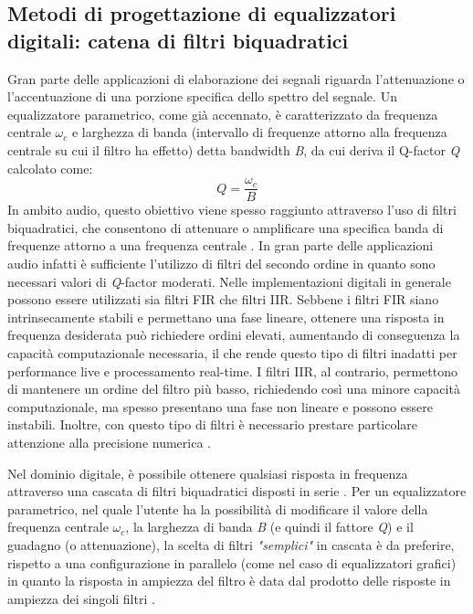 \documentclass[12pt]{report}
\begin{document}
\subsection{Metodi di progettazione di equalizzatori digitali: catena di filtri biquadratici}
Gran parte delle applicazioni di elaborazione dei segnali riguarda l'attenuazione o l'accentuazione di una porzione specifica dello spettro del segnale.
Un equalizzatore parametrico, come già accennato, è caratterizzato da frequenza centrale \(\omega_c\) e larghezza di banda (intervallo di frequenze attorno alla frequenza centrale su cui il filtro ha effetto) detta bandwidth \textit{B}, da cui deriva il Q-factor \textit{Q} calcolato come:
\begin{equation}
    \textit{Q}=\frac{\omega_c}{\textit{B}}
    \label{eq:q-factor}
\end{equation}
In ambito audio, questo obiettivo viene spesso raggiunto attraverso l’uso di filtri biquadratici, che consentono di attenuare o amplificare una specifica banda di frequenze attorno a una frequenza centrale \parencite{reiss2010design}.
In gran parte delle applicazioni audio infatti è sufficiente l'utilizzo di filtri del secondo ordine in quanto sono necessari valori di \textit{Q}-factor moderati. Nelle implementazioni digitali in generale possono essere utilizzati sia filtri FIR che filtri IIR. Sebbene i filtri FIR siano intrinsecamente stabili e permettano una fase lineare, ottenere una risposta in frequenza desiderata può richiedere ordini elevati, aumentando di conseguenza la capacità computazionale necessaria, il che rende questo tipo di filtri inadatti per performance live e processamento real-time.
I filtri IIR, al contrario, permettono di mantenere un ordine del filtro più basso, richiedendo così una minore capacità computazionale, ma spesso presentano una fase non lineare e possono essere instabili. Inoltre, con questo tipo di filtri è necessario prestare particolare attenzione alla precisione numerica \parencite{shpak1991analytical}.

Nel dominio digitale, è possibile ottenere qualsiasi risposta in frequenza attraverso una cascata di filtri biquadratici disposti in serie \parencite{reiss2010design}. Per un equalizzatore parametrico, nel quale l'utente ha la possibilità di modificare il valore della frequenza centrale \(\omega_c\), la larghezza di banda \textit{B} (e quindi il fattore \textit{Q}) e il guadagno (o attenuazione), la scelta di filtri \textit{"semplici"} in cascata è da preferire, rispetto a una configurazione in parallelo (come nel caso di equalizzatori grafici) in quanto la risposta in ampiezza del filtro è data dal prodotto delle risposte in ampiezza dei singoli filtri \parencite{shpak1991analytical}.
\end{document}
